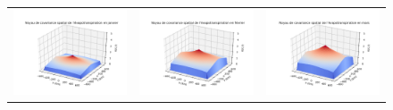 \documentclass[a4paper,11pt]{article}
\numberwithin{equation}{section}
\begin{document}
\begin{figure}[H]
\hspace{-1.3cm}
\begin{tabular}{ccc} 
	\includegraphics[scale=0.34]{images/kernel_evap_m1.png} & \includegraphics[scale=0.34]{images/kernel_evap_m2.png} & \includegraphics[scale=0.34]{images/kernel_evap_m3.png} \\ 

\end{tabular}
\end{figure}
\end{document}

